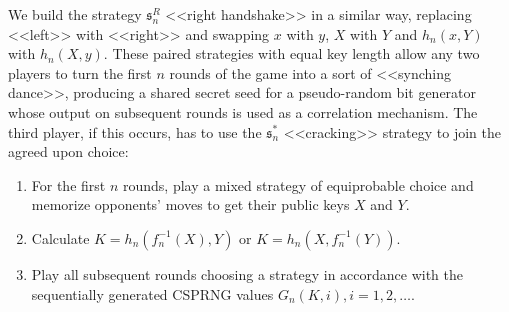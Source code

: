 We build the strategy $\mathfrak{s}^R_n$ <<right handshake>> in a similar way, replacing <<left>> with <<right>> and swapping $x$ with $y$, $X$ with $Y$ and $h_n(x, Y)$ with $h_n(X, y)$. These paired strategies with equal key length allow any two players to turn the first $n$ rounds of the game into a sort of <<synching dance>>, producing a shared secret seed for a pseudo-random bit generator whose output on subsequent rounds is used as a correlation mechanism. The third player, if this occurs, has to use the $\mathfrak{s}^*_n$ <<cracking>> strategy to join the agreed upon choice: %
\begin{enumerate}
	\item For the first $n$ rounds, play a mixed strategy of equiprobable choice and memorize opponents' moves to get their public keys $X$ and $Y$. %
	\item Calculate $K = h_n(f_n^{-1}(X), Y)$ or $K = h_n(X, f_n^{-1}(Y))$. %
	\item Play all subsequent rounds choosing a strategy in accordance with the sequentially generated CSPRNG values $G_n(K, i), i = 1, 2, \ldots$. %
\end{enumerate}

